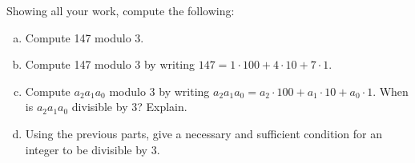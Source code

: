 \documentclass[11pt,letterpaper]{article}
\begin{document}
\newpage



 Showing all your work, compute the following:
	\begin{enumerate}[(a)]
	\item Compute 147 modulo 3. 
	\item Compute 147 modulo 3 by writing $147= 1 \cdot 100 + 4 \cdot 10 + 7 \cdot 1$.
	\item Compute $a_2a_1a_0$ modulo 3 by writing $a_2a_1a_0= a_2 \cdot 100 + a_1 \cdot 10 + a_0 \cdot 1$. When is $a_2a_1a_0$ divisible by 3? Explain.
	\item Using the previous parts, give a necessary and sufficient condition for an integer to be divisible by 3. 
	\end{enumerate} 
\end{document}
